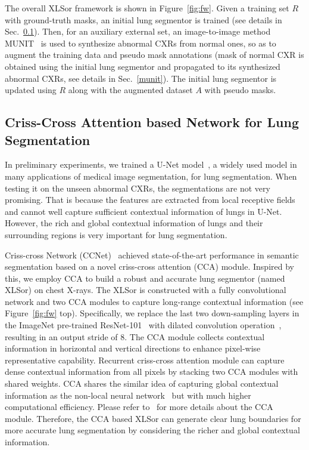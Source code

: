 \documentclass{midl} \usepackage{multirow}
\begin{document}
The overall XLSor framework is shown in Figure~\ref{fig:fw}. Given a training set $R$ with ground-truth masks, an initial lung segmentor is trained (see details in Sec.~\ref{ccnet}). Then, for an auxiliary external set, an image-to-image method MUNIT~\cite{munit} is used to synthesize abnormal CXRs from normal ones, so as to augment the training data and pseudo mask annotations (mask of normal CXR is obtained using the initial lung segmentor and propagated to its synthesized abnormal CXRs, see details in Sec.~\ref{munit}). The initial lung segmentor is updated using $R$ along with the augmented dataset $A$ with pseudo masks.

\subsection{Criss-Cross Attention based Network for Lung Segmentation}
\label{ccnet}

In preliminary experiments, we trained a U-Net model~\cite{U-net}, a widely used model in many applications of medical image segmentation, for lung segmentation. When testing it on the unseen abnormal CXRs, the segmentations are not very promising. That is because the features are extracted from local receptive fields and cannot well capture sufficient contextual information of lungs in U-Net. However, the rich and global contextual information of lungs and their surrounding regions is very important for lung segmentation.

Criss-cross Network (CCNet)~\cite{Huang2018CCNetCA} achieved state-of-the-art performance in semantic segmentation based on a novel criss-cross attention (CCA) module.
Inspired by this, we employ CCA to build a robust and accurate lung segmentor (named XLSor) on chest X-rays. The XLSor is constructed with a fully convolutional network and two CCA modules to capture long-range contextual information (see Figure~\ref{fig:fw} top). Specifically, we replace the last two down-sampling layers in the ImageNet pre-trained ResNet-101~\cite{resnet} with dilated convolution operation~\cite{deeplab}, resulting in an output stride of 8. The CCA module collects contextual
information in horizontal and vertical directions to enhance pixel-wise representative capability.
Recurrent criss-cross attention module can capture dense contextual information from all pixels by stacking two CCA modules with shared weights. CCA shares the similar idea of capturing global contextual information as the non-local neural network~\cite{nonlocal} but with much higher computational efficiency. Please refer to~\cite{Huang2018CCNetCA} for more details about the CCA module.
Therefore, the CCA based XLSor can generate clear lung boundaries for more accurate lung segmentation by considering the richer and global contextual information.
\end{document}
